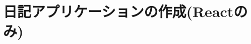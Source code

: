 \chapter{日記アプリケーションの作成(Reactのみ)}
\label{chap:03-todo-with-react}
\begin{reviewimage}[H]%
%
\label{image:03-todo-with-react:diary01}
\end{reviewimage}

\clearpage

